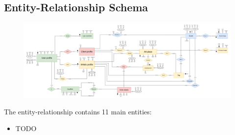 \subsection{Entity-Relationship Schema}

\begin{figure}[h]
    \centering
    \includegraphics[width=1\linewidth]{images/ERschema.pdf}
\end{figure}


The entity-relationship contains 11 main entities:
\begin{itemize}
    \item TODO
\end{itemize}